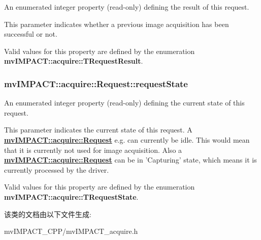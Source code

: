 An enumerated integer property {\bfseries }(read-\/only) defining the result of this request. 

This parameter indicates whether a previous image acquisition has been successful or not.

Valid values for this property are defined by the enumeration {\bfseries mv\+I\+M\+P\+A\+C\+T\+::acquire\+::\+T\+Request\+Result}. \hypertarget{classmv_i_m_p_a_c_t_1_1acquire_1_1_request_acf9adfbc13cad31da7c10741252ed1e1}{
\subsubsection[{request\+State}]{ mv\+I\+M\+P\+A\+C\+T\+::acquire\+::\+Request\+::request\+State}}\label{classmv_i_m_p_a_c_t_1_1acquire_1_1_request_acf9adfbc13cad31da7c10741252ed1e1}


An enumerated integer property {\bfseries }(read-\/only) defining the current state of this request. 

This parameter indicates the current state of this request. A {\bfseries \hyperlink{classmv_i_m_p_a_c_t_1_1acquire_1_1_request}{mv\+I\+M\+P\+A\+C\+T\+::acquire\+::\+Request}} e.\+g. can currently be idle. This would mean that it is currently not used for image acquisition. Also a {\bfseries \hyperlink{classmv_i_m_p_a_c_t_1_1acquire_1_1_request}{mv\+I\+M\+P\+A\+C\+T\+::acquire\+::\+Request}} can be in 'Capturing' state, which means it is currently processed by the driver.

Valid values for this property are defined by the enumeration {\bfseries mv\+I\+M\+P\+A\+C\+T\+::acquire\+::\+T\+Request\+State}. 

该类的文档由以下文件生成\+:\begin{DoxyCompactItemize}
\item 
mv\+I\+M\+P\+A\+C\+T\+\_\+\+C\+P\+P/mv\+I\+M\+P\+A\+C\+T\+\_\+acquire.\+h\end{DoxyCompactItemize}
